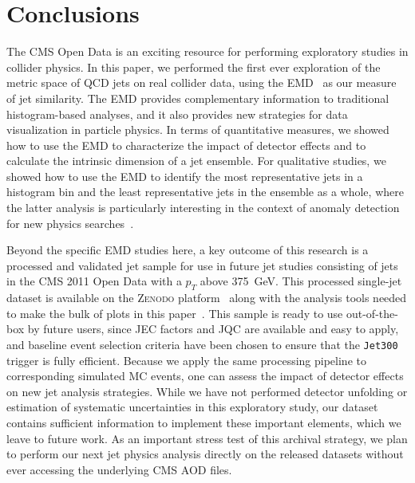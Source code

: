 \documentclass[aps,prd,twocolumn,preprintnumbers,nofootinbib,longbibliography,floatfix,superscriptaddress]{revtex4-1}
\begin{document}
\section{Conclusions}
\label{sec:conclusion}


The CMS Open Data is an exciting resource for performing exploratory studies in collider physics.
%
In this paper, we performed the first ever exploration of the metric space of QCD jets on real collider data, using the EMD~\cite{Komiske:2019fks} as our measure of jet similarity.
%
The EMD provides complementary information to traditional histogram-based analyses, and it also provides new strategies for data visualization in particle physics.
%
In terms of quantitative measures, we showed how to use the EMD to characterize the impact of detector effects and to calculate the intrinsic dimension of a jet ensemble.
%
For qualitative studies, we showed how to use the EMD to identify the most representative jets in a histogram bin and the least representative jets in the ensemble as a whole, where the latter analysis is particularly interesting in the context of anomaly detection for new physics searches~\cite{Aguilar-Saavedra:2017rzt,Collins:2018epr,Hajer:2018kqm,Heimel:2018mkt,Farina:2018fyg,Collins:2019jip,Roy:2019jae}.


Beyond the specific EMD studies here, a key outcome of this research is a processed and validated jet sample for use in future jet studies consisting of jets in the CMS 2011 Open Data with a $p_T$ above \SI{375}{GeV}.
%
This processed single-jet dataset is available on the \textsc{Zenodo} platform~\cite{MOD:ZenodoCMS,MOD:ZenodoMC170,MOD:ZenodoMC300,MOD:ZenodoMC470,MOD:ZenodoMC600,MOD:ZenodoMC800,MOD:ZenodoMC1000,MOD:ZenodoMC1400,MOD:ZenodoMC1800} along with the analysis tools needed to make the bulk of plots in this paper~\cite{EnergyFlow,MODRepo}.
%
This sample is ready to use out-of-the-box by future users, since JEC factors and JQC are available and easy to apply, and baseline event selection criteria have been chosen to ensure that the \texttt{Jet300} trigger is fully efficient.
%
Because we apply the same processing pipeline to corresponding simulated MC events, one can assess the impact of detector effects on new jet analysis strategies.
%
While we have not performed detector unfolding or estimation of systematic uncertainties in this exploratory study, our dataset contains sufficient information to implement these important elements, which we leave to future work.
%
As an important stress test of this archival strategy, we plan to perform our next jet physics analysis directly on the released datasets without ever accessing the underlying CMS AOD files.
\end{document}
